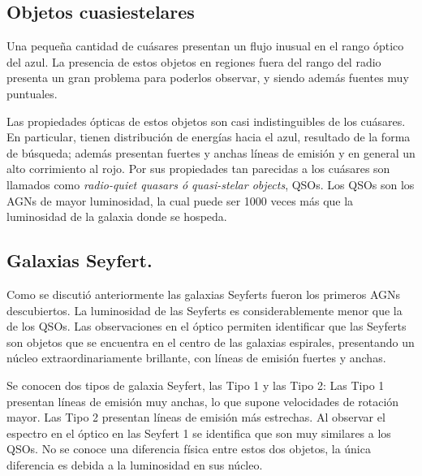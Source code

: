 	\subsection{Objetos cuasiestelares }
	\label{subsec:Quasi-Stelar_Objects}

Una pequeña cantidad de cuásares presentan un flujo inusual en el rango óptico del azul. La presencia de estos objetos en regiones fuera del rango del radio presenta un gran problema para poderlos observar, y siendo además fuentes muy puntuales.

Las propiedades ópticas de estos objetos son casi indistinguibles de los cuásares. En particular, tienen distribución de energías hacia el azul, resultado de la forma de búsqueda; además presentan fuertes y anchas líneas de emisión y en general un alto corrimiento al rojo. Por sus propiedades tan parecidas a los cuásares son llamados como {\textit{radio-quiet quasars ó quasi-stelar objects}}, QSOs. Los QSOs son los AGNs de mayor luminosidad, la cual puede ser 1000 veces más que la luminosidad de la galaxia donde se hospeda.

	\subsection{Galaxias Seyfert.}
	\label{subsec:Seyfert_Galaxy}

Como se discutió anteriormente las galaxias Seyferts fueron los primeros AGNs descubiertos. La luminosidad de las Seyferts es considerablemente menor que la de los QSOs. Las observaciones en el óptico permiten identificar que las Seyferts son objetos que se encuentra en el centro de las galaxias espirales, presentando un núcleo extraordinariamente brillante, con líneas de emisión  fuertes y anchas.

Se conocen dos tipos de galaxia Seyfert, las Tipo 1 y las Tipo 2: Las Tipo 1 presentan líneas de emisión muy anchas, lo que supone velocidades de rotación mayor. Las Tipo 2 presentan líneas de emisión más estrechas. Al observar el espectro en el óptico en las Seyfert 1 se identifica que son muy similares a los QSOs. No se conoce una diferencia física entre estos dos objetos, la única diferencia es debida a la luminosidad en sus núcleo. 


